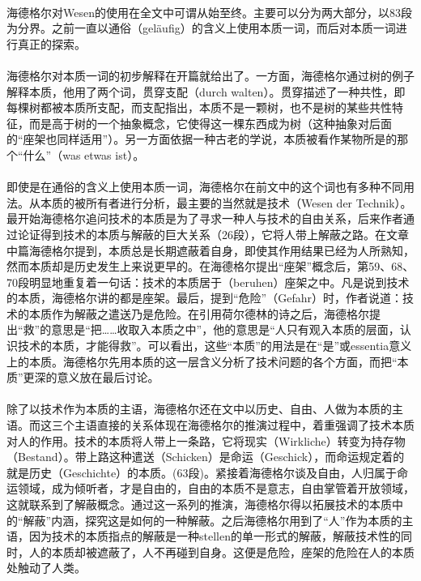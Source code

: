 \documentclass{article}
\begin{document}
			\paragraph{}
		海德格尔对Wesen的使用在全文中可谓从始至终。主要可以分为两大部分，以83段为分界。之前一直以通俗（geläufig）的含义上使用本质一词，而后对本质一词进行真正的探索。
			\paragraph{}
		海德格尔对本质一词的初步解释在开篇就给出了。一方面，海德格尔通过树的例子解释本质，他用了两个词，贯穿支配（durch walten）。贯穿描述了一种共性，即每棵树都被本质所支配，而支配指出，本质不是一颗树，也不是树的某些共性特征，而是高于树的一个抽象概念，它使得这一棵东西成为树（这种抽象对后面的“座架也同样适用”）。另一方面依据一种古老的学说，本质被看作某物所是的那个“什么”（was etwas ist）。
			\paragraph{}
		即使是在通俗的含义上使用本质一词，海德格尔在前文中的这个词也有多种不同用法。从本质的被所有者进行分析，最主要的当然就是技术（Wesen der Technik）。最开始海德格尔追问技术的本质是为了寻求一种人与技术的自由关系，后来作者通过论证得到技术的本质与解蔽的巨大关系（26段），它将人带上解蔽之路。在文章中篇海德格尔提到，本质总是长期遮蔽着自身，即使其作用结果已经为人所熟知，然而本质却是历史发生上来说更早的。在海德格尔提出“座架”概念后，第59、68、70段明显地重复着一句话：技术的本质居于（beruhen）座架之中。凡是说到技术的本质，海德格尔讲的都是座架。最后，提到“危险”（Gefahr）时，作者说道：技术的本质作为解蔽之遣送乃是危险。在引用荷尔德林的诗之后，海德格尔提出“救”的意思是“把……收取入本质之中”，他的意思是“人只有观入本质的层面，认识技术的本质，才能得救”。可以看出，这些“本质”的用法是在“是”或essentia意义上的本质。海德格尔先用本质的这一层含义分析了技术问题的各个方面，而把“本质”更深的意义放在最后讨论。
			\paragraph{}
		除了以技术作为本质的主语，海德格尔还在文中以历史、自由、人做为本质的主语。而这三个主语直接的关系体现在海德格尔的推演过程中，着重强调了技术本质对人的作用。技术的本质将人带上一条路，它将现实（Wirkliche）转变为持存物（Bestand）。带上路这种遣送（Schicken）是命运（Geschick），而命运规定着的就是历史（Geschichte）的本质。(63段)。紧接着海德格尔谈及自由，人归属于命运领域，成为倾听者，才是自由的，自由的本质不是意志，自由掌管着开放领域，这就联系到了解蔽概念。通过这一系列的推演，海德格尔得以拓展技术的本质中的“解蔽”内涵，探究这是如何的一种解蔽。之后海德格尔用到了“人”作为本质的主语，因为技术的本质指点的解蔽是一种stellen的单一形式的解蔽，解蔽技术性的同时，人的本质却被遮蔽了，人不再碰到自身。这便是危险，座架的危险在人的本质处触动了人类。
\end{document}
